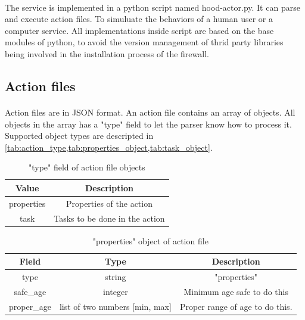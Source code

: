 \documentclass[mscthesis]{usiinfthesis}
\begin{document}
\paragraph{}
The service is implemented in a python script named hood-actor.py. It can parse and execute action files. To simuluate the behaviors of a human user or a computer service. All implementations inside script are based on the base modules of python, to avoid the version management of thrid party libraries being involved in the installation process of the firewall.

\subsection{Action files}
\paragraph{}
Action files are in JSON format. An action file contains an array of objects. All objects in the array has a "type" field to let the parser know how to process it. Supported object types are descripted in \cref{tab:action_type,tab:properties_object,tab:task_object}.

\begin{table}[H]
  \centering
  \begin{tabular}{|c|c|}
    \hline
    Value      & Description                    \\
    \hline
    properties & Properties of the action       \\
    task       & Tasks to be done in the action \\
    \hline
  \end{tabular}
  \caption{"type" field of action file objects}
  \label{tab:action_type}
\end{table}


\begin{table}[H]
  \centering
  \begin{tabular}{|c|c|c|}
    \hline
    Field       & Type                           & Description                     \\
    \hline
    type        & string                         & "properties"                    \\
    safe\_age   & integer                        & Minimum age safe to do this     \\
    proper\_age & list of two numbers [min, max] & Proper range of age to do this. \\
    \hline
  \end{tabular}
  \caption{"properties" object of action file}
  \label{tab:properties_object}
\end{table}
\end{document}
